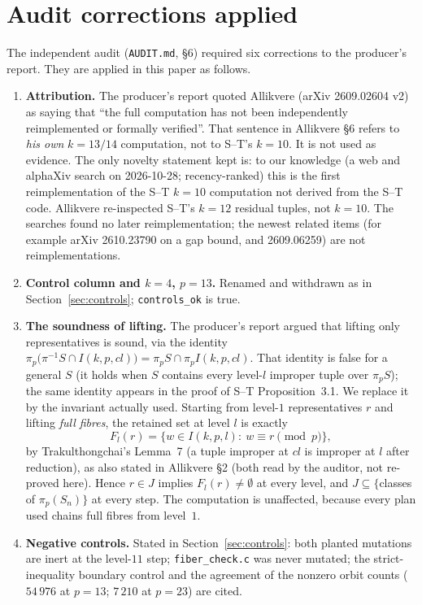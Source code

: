 \documentclass[10pt]{article}
\begin{document}
\section{Audit corrections applied}\label{sec:corr}
The independent audit (\texttt{AUDIT.md}, \S6) required six corrections to the producer's report. They are applied in this paper as follows.
\begin{enumerate}\itemsep=1pt
\item \textbf{Attribution.} The producer's report quoted Allikvere (arXiv 2609.02604 v2) as saying that ``the full computation has not been independently reimplemented or formally verified''. That sentence in Allikvere \S6 refers to \emph{his own} $k=13/14$ computation, not to S--T's $k=10$. It is not used as evidence. The only novelty statement kept is: to our knowledge (a web and alphaXiv search on 2026-10-28; recency-ranked) this is the first reimplementation of the S--T $k=10$ computation not derived from the S--T code. Allikvere re-inspected S--T's $k=12$ residual tuples, not $k=10$. The searches found no later reimplementation; the newest related items (for example arXiv 2610.23790 on a gap bound, and 2609.06259) are not reimplementations.
\item \textbf{Control column and $k=4$, $p=13$.} Renamed and withdrawn as in Section~\ref{sec:controls}; \texttt{controls\_ok} is true.
\item \textbf{The soundness of lifting.} The producer's report argued that lifting only representatives is sound, via the identity $\pi_p\bigl(\pi^{-1}S\cap I(k,p,cl)\bigr)=\pi_pS\cap\pi_pI(k,p,cl)$. That identity is false for a general $S$ (it holds when $S$ contains every level-$l$ improper tuple over $\pi_pS$); the same identity appears in the proof of S--T Proposition~3.1. We replace it by the invariant actually used. Starting from level-$1$ representatives $r$ and lifting \emph{full fibres}, the retained set at level $l$ is exactly
$$F_l(r)=\{w\in I(k,p,l):\ w\equiv r\pmod p\},$$
by Trakulthongchai's Lemma~7 \cite{trak8} (a tuple improper at $cl$ is improper at $l$ after reduction), as also stated in Allikvere \S2 \cite{alli} (both read by the auditor, not re-proved here). Hence $r\in J$ implies $F_l(r)\ne\emptyset$ at every level, and $J\subseteq\{$classes of $\pi_p(S_n)\}$ at every step. The computation is unaffected, because every plan used chains full fibres from level~$1$.
\item \textbf{Negative controls.} Stated in Section~\ref{sec:controls}: both planted mutations are inert at the level-$11$ step; \texttt{fiber\_check.c} was never mutated; the strict-inequality boundary control and the agreement of the nonzero orbit counts ($54\,976$ at $p=13$; $7\,210$ at $p=23$) are cited.

\end{enumerate}
\end{document}
